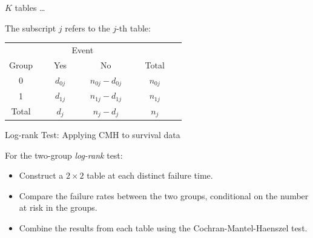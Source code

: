 \documentclass[ignorenonframetext,]{beamer}
\begin{document}
\begin{frame}{%
\protect\hypertarget{k-tables}{%
\(K\) tables \ldots}}

The subscript \(j\) refers to the \(j\)-th table:

\begin{center}
\begin{tabular}{cccc}
\hline \hline
& \multicolumn{2}{c}{Event} & \\ \cline{2-3}
\multicolumn{1}{c}{Group } & ~~~Yes~~~ & ~~~No~~~ & ~~~Total~~~\\ \hline
0 & $d_{0j}$ & $n_{0j} - d_{0j}$ & $n_{0j}$  \\
1 & $d_{1j}$ & $n_{1j} - d_{1j}$ & $n_{1j}$ \\
\hline
Total &  $d_j  $ & $n_j - d_j  $ & $n_j  $  \\ \hline \hline
\end{tabular}
\end{center}

\end{frame}

\begin{frame}{%
\protect\hypertarget{log-rank-test-applying-cmh-to-survival-data}{%
Log-rank Test: Applying CMH to survival data}}

For the two-group \emph{log-rank} test:

\begin{itemize}
\item
  Construct a \(2 \times 2\) table at each distinct failure time.
\item
  Compare the failure rates between the two groups, conditional on the
  number at risk in the groups.
\item
  Combine the results from each table using the Cochran-Mantel-Haenszel
  test.
\end{itemize}

\end{frame}
\end{document}
